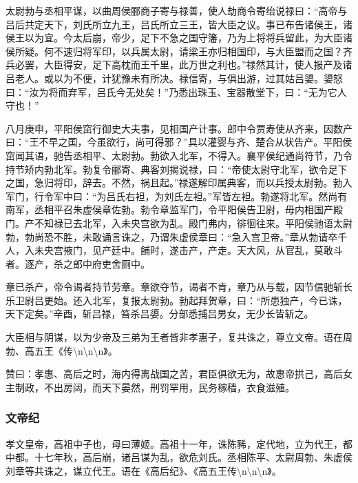\documentclass[]{article}
\begin{document}
太尉勃与丞相平谋，以曲周侯郦商子寄与禄善，使人劫商令寄绐说禄曰：``高帝与吕后共定天下，刘氏所立九王，吕氏所立三王，皆大臣之议。事已布告诸侯王，诸侯王以为宜。今太后崩，帝少，足下不急之国守籓，乃为上将将兵留此，为大臣诸侯所疑。何不速归将军印，以兵属太尉，请梁王亦归相国印，与大臣盟而之国？齐兵必罢，大臣得安，足下高枕而王千里，此万世之利也。''禄然其计，使人报产及诸吕老人。或以为不便，计犹豫未有所决。禄信寄，与俱出游，过其姑吕嬃。嬃怒曰：``汝为将而弃军，吕氏今无处矣！''乃悉出珠玉、宝器散堂下，曰：``无为它人守也！''

八月庚申，平阳侯窋行御史大夫事，见相国产计事。郎中令贾寿使从齐来，因数产曰：``王不早之国，今虽欲行，尚可得邪？''具以灌婴与齐、楚合从状告产。平阳侯窋闻其语，驰告丞相平、太尉勃。勃欲入北军，不得入。襄平侯纪通尚符节，乃令持节矫内勃北军。勃复令郦寄、典客刘揭说禄，曰：``帝使太尉守北军，欲令足下之国，急归将印，辞去。不然，祸且起。''禄遂解印属典客，而以兵授太尉勃。勃入军门，行令军中曰：``为吕氏右袒，为刘氏左袒。''军皆左袒。勃遂将北军。然尚有南军，丞相平召朱虚侯章佐勃。勃令章监军门，令平阳侯告卫尉，毋内相国产殿门。产不知禄已去北军，入未央宫欲为乱。殿门弗内，徘徊往来。平阳侯驰语太尉勃，勃尚恐不胜，未敢诵言诛之，乃谓朱虚侯章曰：``急入宫卫帝。''章从勃请卒千人，入未央宫掖门，见产廷中。餔时，遂击产，产走。天大风，从官乱，莫敢斗者。逐产，杀之郎中府吏舍厕中。

章已杀产，帝令谒者持节劳章。章欲夺节，谒者不肯，章乃从与载，因节信驰斩长乐卫尉吕更始。还入北军，复报太尉勃。勃起拜贺章，曰：``所患独产，今已诛，天下定矣。''辛酉，斩吕禄，笞杀吕嬃。分部悉捕吕男女，无少长皆斩之。

大臣相与阴谋，以为少帝及三弟为王者皆非孝惠子，复共诛之，尊立文帝。语在周勃、高五王《传\textbackslash{}n\textbackslash{}n\textbackslash{}n》。

赞曰：孝惠、高后之时，海内得离战国之苦，君臣俱欲无为，故惠帝拱己，高后女主制政，不出房闼，而天下晏然，刑罚罕用，民务稼穑，衣食滋殖。

\hypertarget{header-n208}{%
\subsubsection{文帝纪}\label{header-n208}}

孝文皇帝，高祖中子也，母曰薄姬。高祖十一年，诛陈豨，定代地，立为代王，都中都。十七年秋，高后崩，诸吕谋为乱，欲危刘氏。丞相陈平、太尉周勃、朱虚侯刘章等共诛之，谋立代王。语在《高后纪》、《高五王传\textbackslash{}n\textbackslash{}n\textbackslash{}n》。
\end{document}
